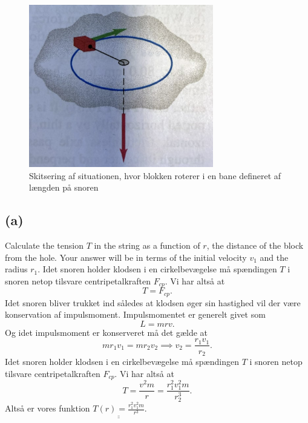 \documentclass[12pt]{article}
\theoremstyle{definition}
\begin{document}
\begin{figure} [ht]
  \centering
  \includegraphics[width=0.5\linewidth]{../figures/AP3.png}
  \caption{Skitsering af situationen, hvor blokken roterer i en bane defineret af længden på snoren}
  \label{fig:AP3}
\end{figure}

\subsection*{(a)}
Calculate the tension $T$ in the string as a function of $r$, the distance of the block from the hole. Your answer will be in terms of the initial velocity $v_1$ and the radius $r_1$.
\bigbreak
Idet snoren holder klodsen i en cirkelbevægelse må spændingen $T$ i snoren netop tilsvare centripetalkraften $F_{cp}$. Vi har altså at
\[ 
T = F_{cp}
.\]
Idet snoren bliver trukket ind således at klodsen øger sin hastighed vil der være konservation af impulsmoment. Impulsmomentet er generelt givet som
\[ 
L = mrv
.\]
Og idet impulsmoment er konserveret må det gælde at
\[ 
m r_1 v_1 = m r_2 v_2 \implies v_2 = \frac{r_1v_1}{r_2}
.\]
Idet snoren holder klodsen i en cirkelbevægelse må spændingen $T$ i snoren netop tilsvare centripetalkraften $F_{cp}$. Vi har altså at
\[ 
T = \frac{v^2m}{r} = \frac{r_1^2v_1^2m}{r_2^3}
.\]
Altså er vores funktion $\underline{\underline{T(r) = \frac{r_1^2v_1^2m}{r^3}}}$.
\end{document}
